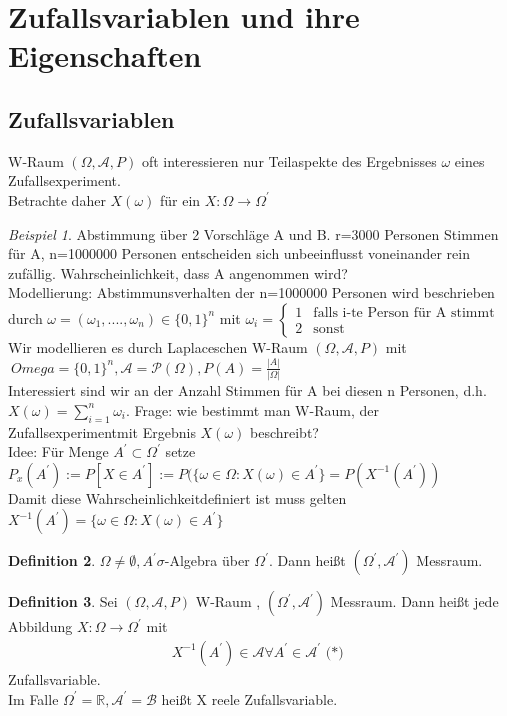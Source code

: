 \documentclass[a4paper,12pt,fleqn]{scrartcl}
\newcommand{\R}{\mathbb{R}}
\newcommand{\m}[1]{\mathcal{ #1 }}
\newcommand{\ZE}{Zufallsexperiment}
\newcommand{\Wk}{Wahrscheinlichkeit}
\newcommand{\ZV}{Zufallsvariable}
\theoremstyle{definition}
\newtheorem{definition}{Definition}[section]
\theoremstyle{plain}
\theoremstyle{remark}
\newtheorem{beispiel}[definition]{Beispiel}
\begin{document}
\section{Zufallsvariablen und ihre Eigenschaften}
\subsection{Zufallsvariablen}
W-Raum $( \Omega , \m{A} , P)$ oft interessieren nur Teilaspekte des Ergebnisses $\omega$ eines \ZE. \\
Betrachte daher $X( \omega ) $ für ein $X : \Omega \rightarrow \Omega^\prime$ \\
\begin{beispiel}
Abstimmung über 2 Vorschläge A und B. r=3000 Personen Stimmen für A, n=1000000 Personen entscheiden sich unbeeinflusst voneinander rein zufällig. \Wk, dass A angenommen wird? \\
Modellierung: Abstimmunsverhalten der n=1000000 Personen wird beschrieben durch $\omega = ( \omega_1, ...., \omega_n) \in \{ 0,1 \}^n$ mit $\omega_i =\begin{cases}1&\text{falls i-te Person für A stimmt}\\2&\text{sonst}\end{cases}$
Wir modellieren es durch Laplaceschen W-Raum $(\Omega , \m{A} , P)$ mit $\ Omega = \{ 0,1 \}^n , \m{A} = \m{P}(\Omega) , P(A) = \frac{|A|}{| \Omega|}$ \\
Interessiert sind wir an der Anzahl Stimmen für A bei diesen n Personen, d.h. $X( \omega) = \sum_{i=1}^{n}{ \omega_i }$.
Frage: wie bestimmt man W-Raum, der \ZE mit Ergebnis $X( \omega)$ beschreibt? \\
Idee: Für Menge $A^\prime \subset \Omega^\prime$ setze $P_x(A^\prime) := P[X \in A^\prime] := P( \{ \omega \in \Omega : X( \omega ) \in A^\prime \} = P(X^{-1}(A^\prime))$ \\
Damit diese \Wk definiert ist muss gelten $X^{-1}(A^\prime) = \{ \omega \in \Omega : X( \omega ) \in A^\prime \}$
\end{beispiel}
\begin{definition}
$\Omega \neq \emptyset , A^\prime \sigma$-Algebra über $\Omega^\prime$. Dann heißt $(\Omega^\prime, \m{A}^\prime)$ Messraum.
\end{definition}
\begin{definition}
Sei $( \Omega , \m{A} , P)$ W-Raum , $(\Omega^\prime, \m{A}^\prime)$ Messraum. Dann heißt jede Abbildung $X: \Omega \rightarrow \Omega^\prime$ mit
\begin{align*}
 X^{-1}(A^\prime) \in \m{A} \forall A^\prime \in \m{A}^\prime \text{ (*) }
\end{align*} 
Zufallsvariable. \\
Im Falle $\Omega^\prime = \R, \m{A}^\prime = \m{B}$ heißt X reele \ZV.
\end{definition}
\end{document}
